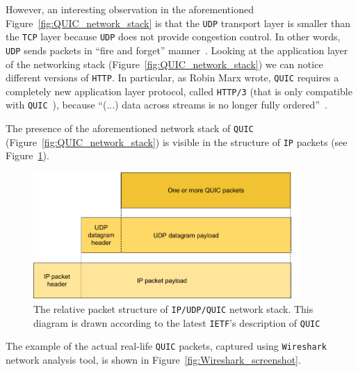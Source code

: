 \documentclass[12pt,a4paper,twoside,openright]{report}
\begin{document}
However, an interesting observation in the aforementioned Figure~\ref{fig:QUIC_network_stack} is that the \texttt{UDP} transport layer is smaller than the \texttt{TCP} layer because \texttt{UDP} does not provide congestion control. 
In other words, \texttt{UDP} sends packets in \enquote{fire and forget} manner~\cite{Google_QUIC_protocol_moving_the_web_from_TCP_to_UDP}.
Looking at the application layer of the networking stack (Figure~\ref{fig:QUIC_network_stack}) we can notice different versions of \texttt{HTTP}.
In particular, as Robin Marx wrote, \texttt{QUIC} requires a completely new application layer protocol, called \texttt{HTTP/3} (that is only compatible with \texttt{QUIC}~\cite{head-of-line-blocking-in-quic-and-http-3-the-details}), because \enquote{(...) data across streams is no longer fully ordered}~\cite{head-of-line-blocking-in-quic-and-http-3-the-details}.



The presence of the aforementioned network stack of \texttt{QUIC} (Figure~\ref{fig:QUIC_network_stack}) is visible in the structure of \texttt{IP} packets (see Figure~\ref{fig:IP_UDP_QUIC_packets}).
    \begin{figure}[H]
    \centering
    \includegraphics[width=0.9\textwidth]{figs/IP_UDP_QUIC packets.png}
    \caption[The relative packet structure of \texttt{IP/UDP/QUIC} network stack]{The relative packet structure of \texttt{IP/UDP/QUIC} network stack. This diagram is drawn according to the latest \texttt{IETF}'s description of \texttt{QUIC}~\cite{ietf-quic-transport-34}}
    \label{fig:IP_UDP_QUIC_packets}
    \end{figure}




The example of the actual real-life \texttt{QUIC} packets, captured using \texttt{Wireshark} network analysis tool, is shown in Figure~\ref{fig:Wireshark_screenshot}.
\end{document}
